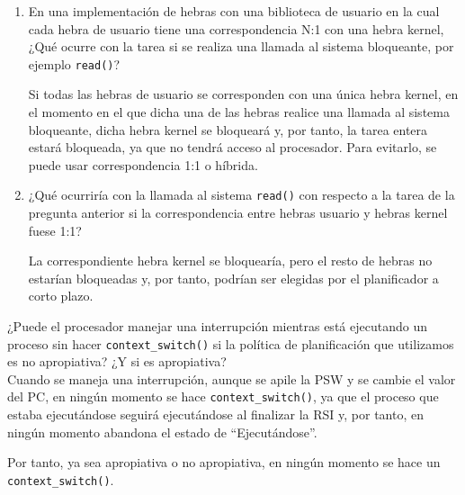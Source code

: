 \begin{ejercicio}
\begin{enumerate}
  
        \item En una implementación de hebras con una biblioteca de usuario en la cual cada hebra de usuario tiene una correspondencia N:1 con una hebra kernel, ¿Qué ocurre con la tarea si se realiza una llamada al sistema bloqueante, por ejemplo \verb|read()|?

        Si todas las hebras de usuario se corresponden con una única hebra kernel, en el momento en el que dicha una de las hebras realice una llamada al sistema bloqueante, dicha hebra kernel se bloqueará y, por tanto, la tarea entera estará bloqueada, ya que no tendrá acceso al procesador. Para evitarlo, se puede usar correspondencia 1:1 o híbrida.

        \item ¿Qué ocurriría con la llamada al sistema \verb|read()| con respecto a la tarea de la pregunta anterior si la correspondencia entre hebras usuario y hebras kernel fuese 1:1?

        La correspondiente hebra kernel se bloquearía, pero el resto de hebras no estarían bloqueadas y, por tanto, podrían ser elegidas por el planificador a corto plazo.
    \end{enumerate}
\end{ejercicio}

\begin{ejercicio}
    ¿Puede el procesador manejar una interrupción mientras está ejecutando un proceso sin hacer \verb|context_switch()| si la política de planificación que utilizamos es no apropiativa? ¿Y si es apropiativa?\\

    Cuando se maneja una interrupción, aunque se apile la PSW y se cambie el valor del PC, en ningún momento se hace \verb|context_switch()|, ya que el proceso que estaba ejecutándose seguirá ejecutándose al finalizar la RSI y, por tanto, en ningún momento abandona el estado de ``Ejecutándose''.

    Por tanto, ya sea apropiativa o no apropiativa, en ningún momento se hace un \verb|context_switch()|.
\end{ejercicio}

